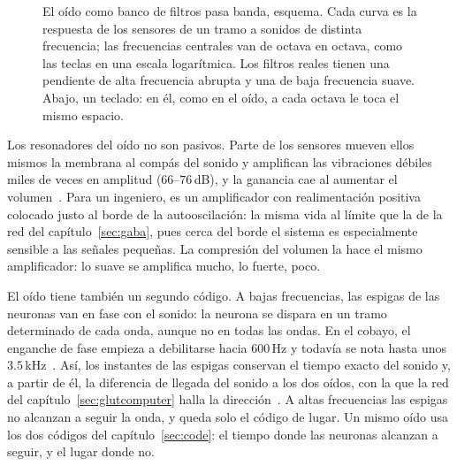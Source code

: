 \begin{figure}[t]
\centering
{}
\caption{El oído como banco de filtros pasa banda, esquema. Cada curva es la respuesta de los sensores de un tramo a sonidos de distinta frecuencia; las frecuencias centrales van de octava en octava, como las teclas en una escala logarítmica. Los filtros reales tienen una pendiente de alta frecuencia abrupta y una de baja frecuencia suave. Abajo, un teclado: en él, como en el oído, a cada octava le toca el mismo espacio.}
\label{fig:filterbank}
\end{figure}

Los resonadores del oído no son pasivos. Parte de los sensores mueven ellos mismos la membrana al compás del sonido y amplifican las vibraciones débiles miles de veces en amplitud ($66$--$76$\,dB), y la ganancia cae al aumentar el volumen~\cite{Ruggero1997,Robles2001}. Para un ingeniero, es un amplificador con realimentación positiva colocado justo al borde de la autooscilación: la misma vida al límite que la de la red del capítulo~\ref{sec:gaba}, pues cerca del borde el sistema es especialmente sensible a las señales pequeñas. La compresión del volumen la hace el mismo amplificador: lo suave se amplifica mucho, lo fuerte, poco.

El oído tiene también un segundo código. A bajas frecuencias, las espigas de las neuronas van en fase con el sonido: la neurona se dispara en un tramo determinado de cada onda, aunque no en todas las ondas. En el cobayo, el enganche de fase empieza a debilitarse hacia $600$\,Hz y todavía se nota hasta unos $3.5$\,kHz~\cite{PalmerRussell1986}. Así, los instantes de las espigas conservan el tiempo exacto del sonido y, a partir de él, la diferencia de llegada del sonido a los dos oídos, con la que la red del capítulo~\ref{sec:glutcomputer} halla la dirección~\cite{Grothe2010}. A altas frecuencias las espigas no alcanzan a seguir la onda, y queda solo el código de lugar. Un mismo oído usa los dos códigos del capítulo~\ref{sec:code}: el tiempo donde las neuronas alcanzan a seguir, y el lugar donde no.

